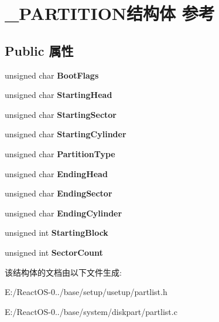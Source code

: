 \hypertarget{struct___p_a_r_t_i_t_i_o_n}{}\section{\+\_\+\+P\+A\+R\+T\+I\+T\+I\+O\+N结构体 参考}
\label{struct___p_a_r_t_i_t_i_o_n}
\subsection*{Public 属性}
\begin{DoxyCompactItemize}
\item 
\mbox{\label{struct___p_a_r_t_i_t_i_o_n_a29ed1c4821ef2dbd006e21b8732be847}} 
unsigned char {\bfseries Boot\+Flags}
\item 
\mbox{\label{struct___p_a_r_t_i_t_i_o_n_a4665c39fb2627edfe4c6db09a2048c14}} 
unsigned char {\bfseries Starting\+Head}
\item 
\mbox{\label{struct___p_a_r_t_i_t_i_o_n_ac684cd4965047e1ced5feba6ace12387}} 
unsigned char {\bfseries Starting\+Sector}
\item 
\mbox{\label{struct___p_a_r_t_i_t_i_o_n_acc76a4a56f0359bbc4ca154b2d649b44}} 
unsigned char {\bfseries Starting\+Cylinder}
\item 
\mbox{\label{struct___p_a_r_t_i_t_i_o_n_a1929ebe0884105d885ca69a7f87659a0}} 
unsigned char {\bfseries Partition\+Type}
\item 
\mbox{\label{struct___p_a_r_t_i_t_i_o_n_a8a5d4a0cfc50c48f8d40f9b3f9c2d844}} 
unsigned char {\bfseries Ending\+Head}
\item 
\mbox{\label{struct___p_a_r_t_i_t_i_o_n_a28fc7f202a1847358ef63ebc5039d93e}} 
unsigned char {\bfseries Ending\+Sector}
\item 
\mbox{\label{struct___p_a_r_t_i_t_i_o_n_aa494d41b1b8a4530eb550761655d6d34}} 
unsigned char {\bfseries Ending\+Cylinder}
\item 
\mbox{\label{struct___p_a_r_t_i_t_i_o_n_a6551d9f5ab5c3b73cd7794723f9adbac}} 
unsigned int {\bfseries Starting\+Block}
\item 
\mbox{\label{struct___p_a_r_t_i_t_i_o_n_aabff9a8422a957756083a8264a275ab1}} 
unsigned int {\bfseries Sector\+Count}
\end{DoxyCompactItemize}


该结构体的文档由以下文件生成\+:\begin{DoxyCompactItemize}
\item 
E\+:/\+React\+O\+S-\/0../base/setup/usetup/partlist.\+h\item 
E\+:/\+React\+O\+S-\/0../base/system/diskpart/partlist.\+c\end{DoxyCompactItemize}
